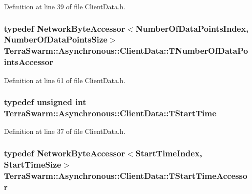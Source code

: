 Definition at line 39 of file Client\-Data.\-h.

\hypertarget{class_terra_swarm_1_1_asynchronous_1_1_client_data_a5a4bdd7c49a72f585ba8c0216a241bb8}{
\subsubsection[{T\-Number\-Of\-Data\-Points\-Accessor}]{\setlength{\rightskip}{0pt plus 5cm}typedef {\bf Network\-Byte\-Accessor}$<${\bf Number\-Of\-Data\-Points\-Index}, {\bf Number\-Of\-Data\-Points\-Size}$>$ {\bf Terra\-Swarm\-::\-Asynchronous\-::\-Client\-Data\-::\-T\-Number\-Of\-Data\-Points\-Accessor}\hspace{0.3cm}{\ttfamily [private]}}}\label{class_terra_swarm_1_1_asynchronous_1_1_client_data_a5a4bdd7c49a72f585ba8c0216a241bb8}


Definition at line 61 of file Client\-Data.\-h.

\hypertarget{class_terra_swarm_1_1_asynchronous_1_1_client_data_a70b07646d3a13d9c2cb16ade44a49966}{
\subsubsection[{T\-Start\-Time}]{\setlength{\rightskip}{0pt plus 5cm}typedef unsigned int {\bf Terra\-Swarm\-::\-Asynchronous\-::\-Client\-Data\-::\-T\-Start\-Time}}}\label{class_terra_swarm_1_1_asynchronous_1_1_client_data_a70b07646d3a13d9c2cb16ade44a49966}


Definition at line 37 of file Client\-Data.\-h.

\hypertarget{class_terra_swarm_1_1_asynchronous_1_1_client_data_a9d8f2e887da6bef7fc623b4ca8e2cf57}{
\subsubsection[{T\-Start\-Time\-Accessor}]{\setlength{\rightskip}{0pt plus 5cm}typedef {\bf Network\-Byte\-Accessor}$<${\bf Start\-Time\-Index}, {\bf Start\-Time\-Size}$>$ {\bf Terra\-Swarm\-::\-Asynchronous\-::\-Client\-Data\-::\-T\-Start\-Time\-Accessor}\hspace{0.3cm}{\ttfamily [private]}}}\label{class_terra_swarm_1_1_asynchronous_1_1_client_data_a9d8f2e887da6bef7fc623b4ca8e2cf57}


